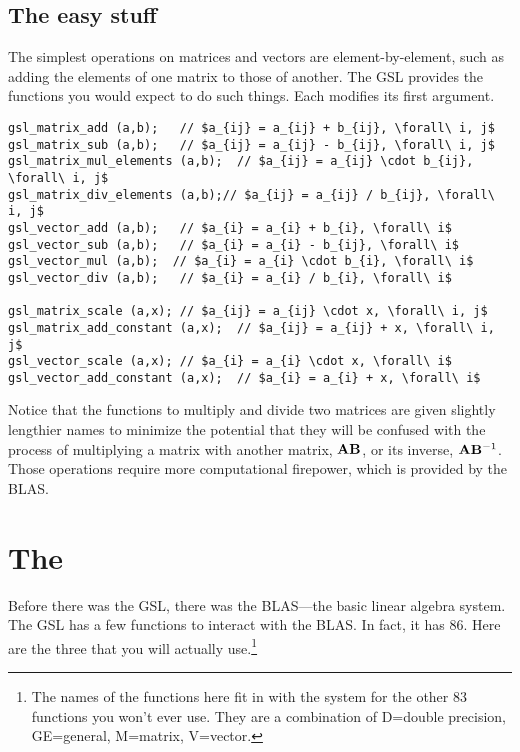 \subsection{The easy stuff} The simplest operations on matrices and
vectors are element-by-element, such as adding the elements of one
matrix to those of another. The GSL provides the functions you would
expect to do such things. Each modifies its first argument.
 
 
 
 
 
 
\lstset{texcl=true} %
\begin{lstlisting}
gsl_matrix_add (a,b);   // $a_{ij} = a_{ij} + b_{ij}, \forall\ i, j$
gsl_matrix_sub (a,b);   // $a_{ij} = a_{ij} - b_{ij}, \forall\ i, j$
gsl_matrix_mul_elements (a,b);  // $a_{ij} = a_{ij} \cdot b_{ij}, \forall\ i, j$
gsl_matrix_div_elements (a,b);// $a_{ij} = a_{ij} / b_{ij}, \forall\ i, j$
gsl_vector_add (a,b);   // $a_{i} = a_{i} + b_{i}, \forall\ i$
gsl_vector_sub (a,b);   // $a_{i} = a_{i} - b_{ij}, \forall\ i$
gsl_vector_mul (a,b);  // $a_{i} = a_{i} \cdot b_{i}, \forall\ i$
gsl_vector_div (a,b);   // $a_{i} = a_{i} / b_{i}, \forall\ i$

gsl_matrix_scale (a,x); // $a_{ij} = a_{ij} \cdot x, \forall\ i, j$
gsl_matrix_add_constant (a,x);  // $a_{ij} = a_{ij} + x, \forall\ i, j$
gsl_vector_scale (a,x); // $a_{i} = a_{i} \cdot x, \forall\ i$
gsl_vector_add_constant (a,x);  // $a_{i} = a_{i} + x, \forall\ i$
\end{lstlisting}

Notice that the functions to multiply and divide two matrices are given
slightly lengthier names to minimize the potential that they will be
confused with the process of multiplying a matrix with another matrix,
${\bf A}{\bf B}$, or its inverse, 
${\bf A}{\bf B}^{-1}$. Those operations require more computational firepower, which
is provided by the BLAS.


\section{The } 
 
Before there was the GSL, there was the BLAS---the basic linear algebra
system. The GSL has a few functions to interact with the BLAS. In fact,
it has 86. Here are the three that you will actually 
use.\footnote{The names of the functions here fit in with the system
for the other 83 functions you won't ever use. They are a combination
of D=double precision, GE=general, M=matrix, V=vector.}

